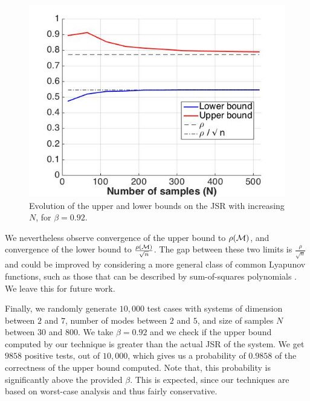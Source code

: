 \begin{figure}
\begin{center}
\includegraphics[trim = 5mm 5mm 5mm 5mm,scale=0.35]{bounds1.jpg}

\caption{Evolution of the upper and lower bounds on the JSR with increasing $N$, for $\beta=0.92$.}
\label{fig:21}
\end{center}
\end{figure}

We nevertheless observe convergence of the upper bound to $\rho(\mathcal{M})$, and convergence of the lower bound to $\frac{\rho(\mathcal{M})}{\sqrt{n}}$. The gap between these two limits is $\frac{\rho}{\sqrt{n}}$ and could be improved by considering a more general class of common Lyapunov functions, such as those that can be described by sum-of-squares polynomials \cite{sosLyap}. We leave this for future work.

Finally, we randomly generate $10,000$ test cases with systems of dimension between $2$ and $7$, number of modes between $2$ and $5$, and size of samples $N$ between $30$ and $800$. We take $\beta = 0.92$ and we check if the upper bound computed by our technique is greater than the actual JSR of the system. We get $9858$ positive tests, out of $10,000$, which gives us a probability of $0.9858$ of the correctness of the upper bound computed. Note that, this probability is significantly above the provided $\beta$. This is expected, since our techniques are based on worst-case analysis and thus fairly conservative.



